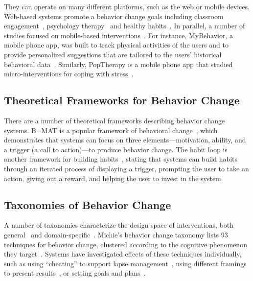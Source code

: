 They can operate on many different platforms, such as the web or mobile devices. Web-based systems promote a behavior change goals including classroom engagement~\cite{anderson2014engaging, anderson2013steering}, psychology therapy~\cite{doi:10.1080/15228830802094429} and healthy habits~\cite{cugelman2013gamification, lyons2014behavior}. In parallel, a number of studies focused on mobile-based interventions~\cite{paredes2014poptherapy, RILEY201567, FJELDSOE2009165, Whittaker09, info:doi/10.2196/mhealth.4160}. For instance, MyBehavior, a mobile phone app, was built to track physical activities of the users and to provide personalized suggestions that are tailored to the users' historical behavioral data~\cite{info:doi/10.2196/mhealth.4160}. Similarly, PopTherapy is a mobile phone app that studied micro-interventions for coping with stress~\cite{paredes2014poptherapy}.

\subsection{Theoretical Frameworks for Behavior Change}


There are a number of theoretical frameworks describing behavior change systems. B=MAT is a popular framework of behavioral change~\cite{fogg2002persuasive}, which demonstrates that systems can focus on three elements---motivation, ability, and a trigger (a call to action)---to produce behavior change. The habit loop is another framework for building habits~\cite{eyal2014hooked}, stating that systems can build habits through an iterated process of displaying a trigger, prompting the user to take an action, giving out a reward, and helping the user to invest in the system.

\subsection{Taxonomies of Behavior Change}

A number of taxonomies characterize the design space of interventions, both general~\cite{michie2013behavior, behaviourchangewheel, abraham2008taxonomy, dolanmindspace} and domain-specific~\cite{hardeman2000interventions, west2010behavior}. Michie's behavior change taxonomy lists 93 techniques for behavior change, clustered according to the cognitive phenomenon they target~\cite{michie2013behavior}. Systems have investigated effects of these techniques individually, such as using ``cheating'' to support lapse management~\cite{agapie2016staying}, using different framings to present results~\cite{kim2016timeaware}, or setting goals and plans~\cite{agapie2016plansourcing}.

